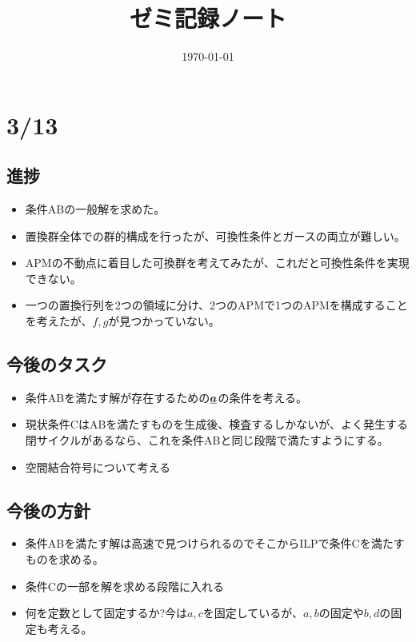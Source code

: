 \documentclass[a4paper,11pt,dvipdfmx]{jsarticle}
\theoremstyle{definition}
\begin{document}
\title{ゼミ記録ノート}
\author{}
\date{\today}
\maketitle


\section{3/13}
\subsection{進捗}
\begin{itemize}
  \item 条件ABの一般解を求めた。
  \item 置換群全体での群的構成を行ったが、可換性条件とガースの両立が難しい。
  \item APMの不動点に着目した可換群を考えてみたが、これだと可換性条件を実現できない。
  \item 一つの置換行列を2つの領域に分け、2つのAPMで1つのAPMを構成することを考えたが、$f,g$が見つかっていない。
\end{itemize}

\subsection{今後のタスク}
\begin{itemize}
  \item 条件ABを満たす解が存在するための$\underline{\bm{a}}$の条件を考える。
  \item 現状条件CはABを満たすものを生成後、検査するしかないが、よく発生する閉サイクルがあるなら、これを条件ABと同じ段階で満たすようにする。
  \item 空間結合符号について考える
\end{itemize}

\subsection{今後の方針}
\begin{itemize}
  \item 条件ABを満たす解は高速で見つけられるのでそこからILPで条件Cを満たすものを求める。
  \item 条件Cの一部を解を求める段階に入れる
  \item 何を定数として固定するか?今は$a,c$を固定しているが、$a,b$の固定や$b,d$の固定も考える。
\end{itemize}
\end{document}
